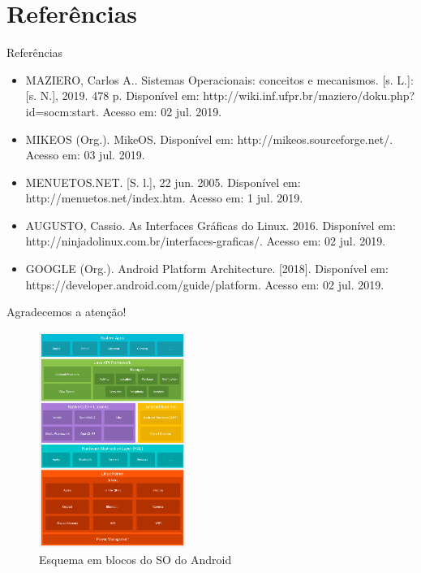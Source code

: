 \documentclass{beamer}
\begin{document}
  \section{Referências}
    \begin{frame}{Referências}
      \begin{itemize}
        \item MAZIERO, Carlos A.. Sistemas Operacionais: conceitos e mecanismos. [s. L.]: [s. N.], 2019. 478 p. Disponível em: http://wiki.inf.ufpr.br/maziero/doku.php?id=socm:start. Acesso em: 02 jul. 2019.
        \item MIKEOS (Org.). MikeOS. Disponível em: http://mikeos.sourceforge.net/. Acesso em: 03 jul. 2019.
        \item MENUETOS.NET. [S. l.], 22 jun. 2005. Disponível em: http://menuetos.net/index.htm. Acesso em: 1 jul. 2019.
        \item AUGUSTO, Cassio. As Interfaces Gráficas do Linux. 2016. Disponível em: http://ninjadolinux.com.br/interfaces-graficas/. Acesso em: 02 jul. 2019.
        \item GOOGLE (Org.). Android Platform Architecture. [2018]. Disponível em: https://developer.android.com/guide/platform. Acesso em: 02 jul. 2019.
      \end{itemize}
    \end{frame}
  
    \begin{frame}{Agradecemos a atenção!}
      \begin{figure}[!htb]
        \centering
        \includegraphics[height=200pt, keepaspectratio=true]{fundamentos/TheAndroidSoftwareStack.png}
        \caption{Esquema em blocos do SO do Android}
        \label{The Android software stack}
      \end{figure}
    \end{frame}
\end{document}
